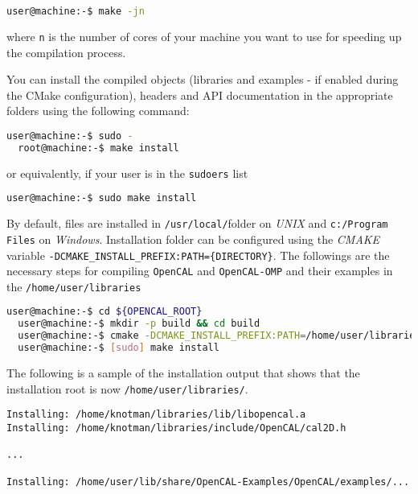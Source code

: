 \begin{lstlisting}[numbers=none,language=bash,label={ch:quickstart:ebuild}]
  user@machine:-$ make -jn
\end{lstlisting}
where \verb'n' is the number of cores of your machine you want to use
for speeding up the compilation process.

You can install the compiled objects (libraries and examples - if
enabled during the CMake configuration), headers and API documentation
in the appropriate folders using the following command:

\begin{lstlisting}[numbers=none,language=bash,label={ch:quickstart:install}]
  user@machine:-$ sudo -
  root@machine:-$ make install
\end{lstlisting}

or equivalently, if your user is in the \texttt{sudoers} list

\begin{lstlisting}[numbers=none,language=bash,label={ch:quickstart:sudoinstall}]
  user@machine:-$ sudo make install
\end{lstlisting}

By default, files are installed in \texttt{/usr/local/}folder on \textit{UNIX} and  \texttt{c:/Program Files} on \textit{Windows}.
Installation folder can be configured using the \textit{CMAKE} variable  \texttt{-DCMAKE\_INSTALL\_PREFIX:PATH=\{DIRECTORY\}}.
The followings are the necessary steps for compiling \verb'OpenCAL' and \verb'OpenCAL-OMP' and their examples
in the \texttt{/home/user/libraries}

\begin{lstlisting}[numbers=none,language=bash,label={ch:quickstart:sudoinstall}]
  user@machine:-$ cd ${OPENCAL_ROOT}
  user@machine:-$ mkdir -p build && cd build
  user@machine:-$ cmake -DCMAKE_INSTALL_PREFIX:PATH=/home/user/libraries/ -DBUILD_EXAMPLES=ON -DBUILD_OPENCAL_OMP=ON ..
  user@machine:-$ [sudo] make install
\end{lstlisting}
The following is a sample of the installation output that shows that the installation root is now \texttt{/home/user/libraries/}.
\begin{mdframed}
{\small
\begin{verbatim}
Installing: /home/knotman/libraries/lib/libopencal.a
Installing: /home/knotman/libraries/include/OpenCAL/cal2D.h

...

Installing: /home/user/lib/share/OpenCAL-Examples/OpenCAL/examples/...
\end{verbatim}
}
\end{mdframed}

